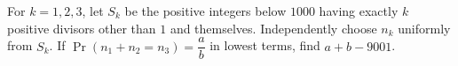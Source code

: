 For $k=1,2,3$, let $S_k$ be the positive integers below $1000$ having exactly $k$ positive divisors other than $1$ and themselves. Independently choose $n_k$ uniformly from $S_k$. If $\Pr(n_1+n_2=n_3)=\dfrac{a}{b}$ in lowest terms, find $a+b-9001$.
